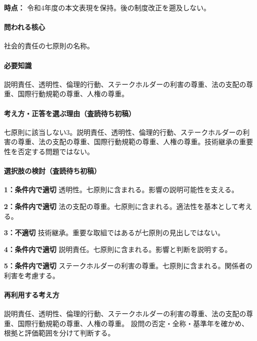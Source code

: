 \noindent\textbf{時点：} 令和4年度の本文表現を保持。後の制度改正を遡及しない。\par

\paragraph{問われる核心} 社会的責任の七原則の名称。

\paragraph{必要知識} 説明責任、透明性、倫理的行動、ステークホルダーの利害の尊重、法の支配の尊重、国際行動規範の尊重、人権の尊重。

\paragraph{考え方・正答を選ぶ理由（査読待ち初稿）} 七原則に該当しない3。説明責任、透明性、倫理的行動、ステークホルダーの利害の尊重、法の支配の尊重、国際行動規範の尊重、人権の尊重。技術継承の重要性を否定する問題ではない。

\paragraph{選択肢の検討（査読待ち初稿）}\mbox{}\par

\noindent\textbf{1：条件内で適切} 透明性。七原則に含まれる。影響の説明可能性を支える。\par

\noindent\textbf{2：条件内で適切} 法の支配の尊重。七原則に含まれる。適法性を基本として考える。\par

\noindent\textbf{3：不適切} 技術継承。重要な取組ではあるが七原則の見出しではない。\par

\noindent\textbf{4：条件内で適切} 説明責任。七原則に含まれる。影響と判断を説明する。\par

\noindent\textbf{5：条件内で適切} ステークホルダーの利害の尊重。七原則に含まれる。関係者の利害を考慮する。\par

\paragraph{再利用する考え方} 説明責任、透明性、倫理的行動、ステークホルダーの利害の尊重、法の支配の尊重、国際行動規範の尊重、人権の尊重。 設問の否定・全称・基準年を確かめ、根拠と評価範囲を分けて判断する。

